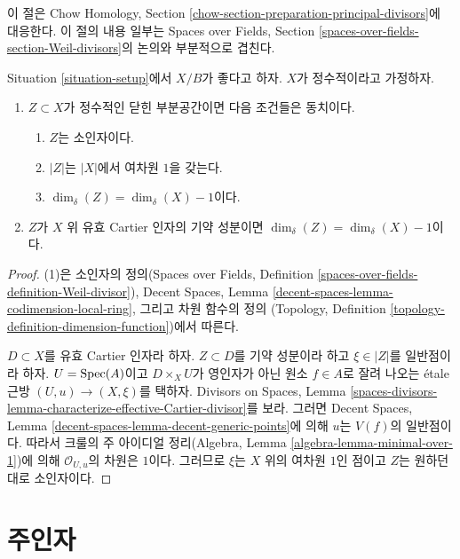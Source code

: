 \noindent
이 절은 Chow Homology, Section
\ref{chow-section-preparation-principal-divisors}에 대응한다.
이 절의 내용 일부는 Spaces over Fields, Section
\ref{spaces-over-fields-section-Weil-divisors}의 논의와 부분적으로 겹친다.

\begin{lemma}
\label{lemma-divisor-delta-dimension}
Situation \ref{situation-setup}에서 $X/B$가 좋다고 하자.
$X$가 정수적이라고 가정하자.
\begin{enumerate}
\item $Z \subset X$가 정수적인 닫힌 부분공간이면 다음 조건들은 동치이다.
\begin{enumerate}
\item $Z$는 소인자이다.
\item $|Z|$는 $|X|$에서 여차원 $1$을 갖는다.
\item $\dim_\delta(Z) = \dim_\delta(X) - 1$이다.
\end{enumerate}
\item $Z$가 $X$ 위 유효 Cartier 인자의 기약 성분이면
$\dim_\delta(Z) = \dim_\delta(X) - 1$이다.
\end{enumerate}
\end{lemma}

\begin{proof}
(1)은 소인자의 정의(Spaces over Fields, Definition
\ref{spaces-over-fields-definition-Weil-divisor}), Decent Spaces, Lemma
\ref{decent-spaces-lemma-codimension-local-ring}, 그리고 차원 함수의 정의
(Topology, Definition \ref{topology-definition-dimension-function})에서 따른다.

\medskip\noindent
$D \subset X$를 유효 Cartier 인자라 하자. $Z \subset D$를 기약
성분이라 하고 $\xi \in |Z|$를 일반점이라 하자. $U = \mathop{\mathrm{Spec}}(A)$이고
$D \times_X U$가 영인자가 아닌 원소 $f \in A$로 잘려 나오는
\'etale 근방 $(U, u) \to (X, \xi)$를 택하자. Divisors on Spaces, Lemma
\ref{spaces-divisors-lemma-characterize-effective-Cartier-divisor}를 보라.
그러면 Decent Spaces, Lemma
\ref{decent-spaces-lemma-decent-generic-points}에 의해 $u$는 $V(f)$의
일반점이다. 따라서 크룰의 주 아이디얼 정리(Algebra, Lemma
\ref{algebra-lemma-minimal-over-1})에 의해 $\mathcal{O}_{U, u}$의
차원은 $1$이다. 그러므로 $\xi$는 $X$ 위의 여차원 $1$인 점이고
$Z$는 원하던 대로 소인자이다.
\end{proof}

\section{주인자}
\label{section-principal-divisors}

